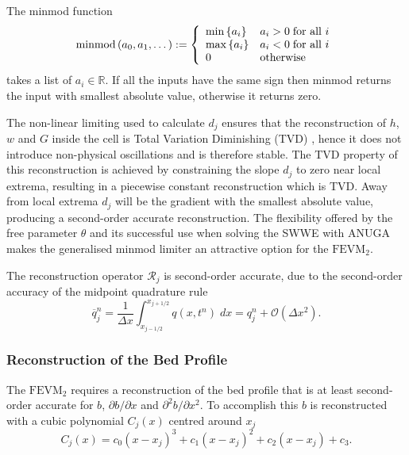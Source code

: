 \begin{defn}
The minmod function
\begin{equation*}
\text{minmod}\left(a_0,a_1,\dots\right) := \left\lbrace \begin{array}{l l}
\min\left\lbrace a_i\right\rbrace & a_i > 0 \; \text{for all } i \\
\max\left\lbrace a_i\right\rbrace & a_i < 0  \; \text{for all } i \\
0 & \text{otherwise}\\
\end{array} \right.
\end{equation*}
takes a list of $a_i \in \mathbb{R}$. If all the inputs have the same sign then minmod returns the input with smallest absolute value, otherwise it returns zero. 
\end{defn}
The non-linear limiting used to calculate $d_j$ ensures that the reconstruction of $h$, $w$ and $G$ inside the cell is Total Variation Diminishing (TVD) \cite{Harten-1983-357}, hence it does not introduce non-physical oscillations and is therefore stable. The TVD property of this reconstruction is achieved by constraining the slope $d_j$ to zero near local extrema, resulting in a piecewise constant reconstruction which is TVD. Away from local extrema $d_j$ will be the gradient with the smallest absolute value, producing a second-order accurate reconstruction. The flexibility offered by the free parameter $\theta$ and its successful use when solving the SWWE with ANUGA \cite{ANUGA} makes the generalised minmod limiter an attractive option for the $\text{FEVM}_2$.

The reconstruction operator $\mathcal{R}_{j} $ is second-order accurate, due to the second-order accuracy of the midpoint quadrature rule \cite{Davis-Rabinowitz-1984}
\begin{equation}
\overline{q}^n_j = \frac{1}{\Delta x} \int_{x_{j-1/2}}^{x_{j+1/2}} q(x,t^n) \; dx = q_j^n + \mathcal{O}\left(\Delta x^2\right).
\end{equation}


\subsubsection{Reconstruction of the Bed Profile}
The $\text{FEVM}_2$ requires a reconstruction of the bed profile that is at least second-order accurate for $b$, $\partial b / \partial x$ and $\partial^2 b / \partial x^2$. To accomplish this $b$ is reconstructed with a cubic polynomial $C_j(x)$ centred around $x_j$
\begin{equation*}
C_j(x) = c_0 \left(x - x_j\right)^3 + c_1 \left(x - x_j\right)^2 + c_2 \left(x - x_j\right) + c_3.
\label{eqn:cubicforbedrecon}
\end{equation*}

